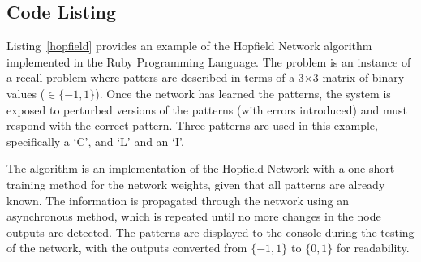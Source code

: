 \subsection{Code Listing}
Listing~\ref{hopfield} provides an example of the Hopfield Network algorithm implemented in the Ruby Programming Language. 
The problem is an instance of a recall problem where patters are described in terms of a 3$\times$3 matrix of binary values ($\in \{-1,1\}$). Once the network has learned the patterns, the system is exposed to perturbed versions of the patterns (with errors introduced) and must respond with the correct pattern. Three patterns are used in this example, specifically a `C', and `L' and an `I'.

The algorithm is an implementation of the Hopfield Network with a one-short training method for the network weights, given that all patterns are already known. The information is propagated through the network using an asynchronous method, which is repeated until no more changes in the node outputs are detected. The patterns are displayed to the console during the testing of the network, with the outputs converted from $\{-1,1\}$ to $\{0,1\}$ for readability.



